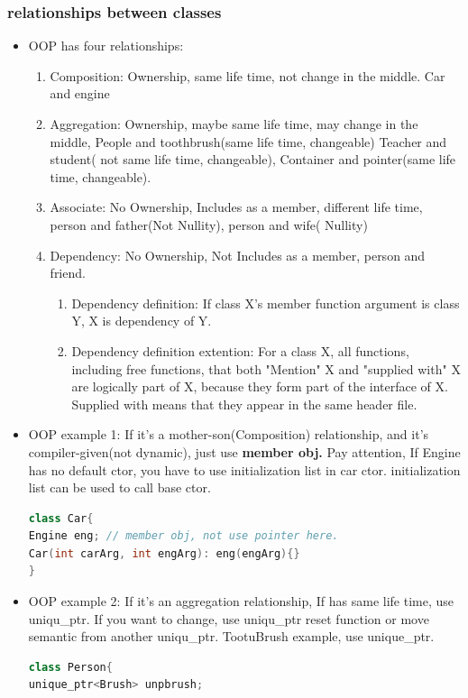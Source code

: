 \documentclass[a4paper,12pt,twoside]{book}
\begin{document}
\subsubsection{relationships between classes}
\begin{itemize}
\item OOP has four relationships:
\begin{enumerate}
\item Composition: Ownership, same life time,  not change in the middle. Car and engine
\item Aggregation: Ownership, maybe same life time, may change in the middle, People and toothbrush(same life time, changeable) Teacher and student( not same life time, changeable), Container and pointer(same life time, changeable).
\item Associate: No Ownership, Includes as a member,  different life time,  person and father(Not Nullity), person and wife( Nullity)
\item Dependency: No Ownership, Not Includes as a member, person and friend.
\begin{enumerate}
\item Dependency definition: If class X's member function argument is class Y, X is dependency of Y.
\item Dependency definition extention: For a class X, all functions, including free functions, that both "Mention" X and "supplied with" X are logically part of X, because they form part of the interface of X. Supplied with means that they appear in the same header file.
\end{enumerate}
\end{enumerate}

\item OOP example 1: If it's a mother-son(Composition) relationship, and it's compiler-given(not dynamic), just use \textbf{member obj.}   Pay attention, If Engine has no default ctor, you have to use initialization list in car ctor.  initialization list can be used to call base ctor.
\begin{lstlisting}[frame=single, language=c++]
class Car{
Engine eng; // member obj, not use pointer here.
Car(int carArg, int engArg): eng(engArg){}
}
\end{lstlisting}

\item OOP example 2:  If it's an aggregation relationship, If has same life time, use uniqu\_ptr. If you want to change, use uniqu\_ptr reset function or move semantic from another uniqu\_ptr.   TootuBrush example, use unique\_ptr.
\begin{lstlisting}[frame=single, language=c++]
class Person{
unique_ptr<Brush> unpbrush;


\end{lstlisting}
\end{itemize}
\end{document}
